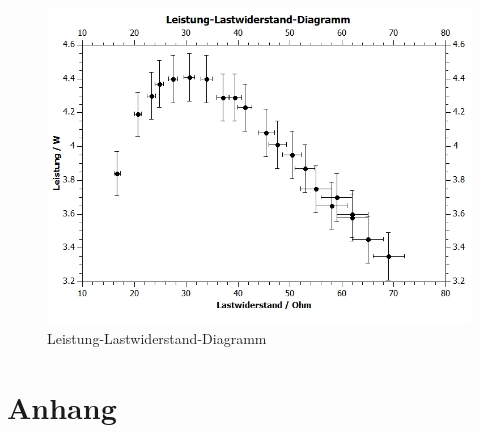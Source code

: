 \documentclass[12pt,a4paper,twoside]{article}
\begin{document}
\begin{figure}[H]
    \centering
    \includegraphics[width=0.6\linewidth, angle=0]{nudes/Leistung-Lastwiderstand-Diagramm.jpg}
    \caption{Leistung-Lastwiderstand-Diagramm}
    \label{fig:LeistungLastwiderstandDiagrammAW}
\end{figure}



\section{Anhang}



\printbibliography[heading=bibintoc]
\end{document}
